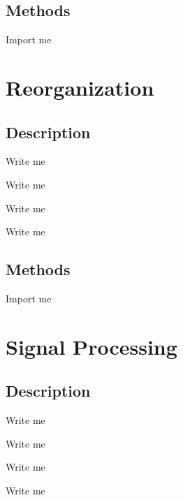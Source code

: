 \documentclass[letterpaper,10pt,english]{sphinxmanual}
\begin{document}
\subsection{Methods}
\label{\detokenize{Sub-Packages:id8}}
\begin{DUlineblock}{0em}
\item[] Import me
\end{DUlineblock}


\section{Reorganization}
\label{\detokenize{Sub-Packages:reorganization}}\label{\detokenize{Sub-Packages:reorganization-module}}

\subsection{Description}
\label{\detokenize{Sub-Packages:id9}}
\begin{DUlineblock}{0em}
\item[] Write me
\item[] Write me
\item[] Write me
\item[] Write me
\end{DUlineblock}


\subsection{Methods}
\label{\detokenize{Sub-Packages:id10}}
\begin{DUlineblock}{0em}
\item[] Import me
\end{DUlineblock}


\section{Signal Processing}
\label{\detokenize{Sub-Packages:signal-processing}}\label{\detokenize{Sub-Packages:signal-processing-module}}

\subsection{Description}
\label{\detokenize{Sub-Packages:id11}}
\begin{DUlineblock}{0em}
\item[] Write me
\item[] Write me
\item[] Write me
\item[] Write me
\end{DUlineblock}
\end{document}
